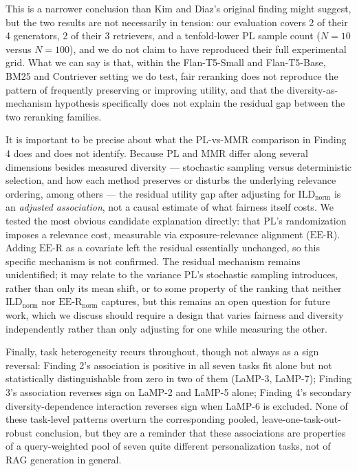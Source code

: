 \documentclass[11pt]{article}
\newcommand{\eer}{\ensuremath{\mathrm{EE\text{-}R}}}
\newcommand{\eernorm}{\ensuremath{\eer_{\mathrm{norm}}}}
\newcommand{\ild}{\ensuremath{\mathrm{ILD}}}
\newcommand{\ildnorm}{\ensuremath{\ild_{\mathrm{norm}}}}
\begin{document}
This is a narrower conclusion than Kim and Diaz's original finding might
suggest, but the two results are not necessarily in tension: our
evaluation covers 2 of their 4 generators, 2 of their 3 retrievers, and a
tenfold-lower PL sample count ($N=10$ versus $N=100$), and we do not claim
to have reproduced their full experimental grid. What we can say is that,
within the Flan-T5-Small and Flan-T5-Base, BM25 and Contriever setting we
do test, fair reranking does not reproduce the pattern of frequently
preserving or improving utility, and that the diversity-as-mechanism
hypothesis specifically does not explain the residual gap between the two
reranking families.

It is important to be precise about what the PL-vs-MMR comparison in
Finding 4 does and does not identify. Because PL and MMR differ along
several dimensions besides measured diversity --- stochastic sampling
versus deterministic selection, and how each method preserves or disturbs
the underlying relevance ordering, among others --- the residual utility
gap after adjusting for \ildnorm{} is an \emph{adjusted association}, not
a causal estimate of what fairness itself costs. We tested the most
obvious candidate explanation directly: that PL's randomization imposes a
relevance cost, measurable via exposure-relevance alignment (\eer{}).
Adding \eer{} as a covariate left the residual essentially unchanged,
so this specific mechanism is not confirmed. The residual mechanism
remains unidentified; it may relate to the variance PL's stochastic
sampling introduces, rather than only its mean shift, or to some property
of the ranking that neither \ildnorm{} nor \eernorm{} captures, but this
remains an open question for future work, which we discuss should require
a design that varies fairness and diversity independently rather than
only adjusting for one while measuring the other.

Finally, task heterogeneity recurs throughout, though not always as a sign
reversal: Finding 2's association is positive in all seven tasks fit
alone but not statistically distinguishable from zero in two of them
(LaMP-3, LaMP-7); Finding 3's association reverses sign on LaMP-2 and
LaMP-5 alone; Finding 4's secondary diversity-dependence interaction
reverses sign when LaMP-6 is excluded. None of these task-level patterns
overturn the corresponding pooled, leave-one-task-out-robust conclusion,
but they
are a reminder that these associations are properties of a
query-weighted pool of seven quite different personalization tasks, not
of RAG generation in general.
\end{document}
